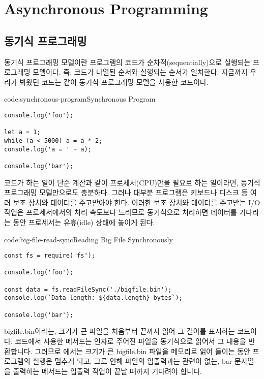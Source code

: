 \section{Asynchronous Programming}\label{sect:asynchronous-programming}

\subsection*{동기식 프로그래밍}

동기식 프로그래밍 모델이란 프로그램의 코드가 순차적(sequentially)으로 실행되는 프로그래밍 모델이다. 즉, 코드가 나열된 순서와 실행되는 순서가 일치한다. 지금까지 우리가 봐왔던 코드는 \과 같이 동기식 프로그래밍 모델을 사용한 코드이다.

\begin{codeenv}{code:synchronous-program}{Synchronous Program}\begin{verbatim}
console.log('foo');

let a = 1;
while (a < 5000) a = a * 2;
console.log('a = ' + a);

console.log('bar');
\end{verbatim}
\end{codeenv}

코드가 하는 일이 단순 계산과 같이 프로세서(CPU)만을 필요로 하는 일이라면, 동기식 프로그래밍 모델만으로도 충분하다. 그러나 대부분 프로그램은 키보드나 디스크 등 여러 보조 장치와 데이터를 주고받아야 한다. 이러한 보조 장치와 데이터를 주고받는 I/O 작업은 프로세서에서의 처리 속도보다 느리므로 동기식으로 처리하면 데이터를 기다리는 동안 프로세서는 유휴(idle) 상태에 놓이게 된다.

\begin{codeenv}{code:big-file-read-sync}{Reading Big File Synchronously}\begin{verbatim}
const fs = require('fs');

console.log('foo');

const data = fs.readFileSync('./bigfile.bin');
console.log(`Data length: ${data.length} bytes`);

console.log('bar');
\end{verbatim}
\end{codeenv}

\는 bigfile.bin이라는, 크기가 큰 파일을 처음부터 끝까지 읽어 그 길이를 표시하는 코드이다. 코드에서 사용한  메서드는 인자로 주어진 파일을 동기식으로 읽어서 그 내용을 반환합니다. 그러므로 에서는 크기가 큰 bigfile.bin 파일을 메모리로 읽어 들이는 동안 프로그램의 실행은 멈추게 되고, 그로 인해 파일의 입출력과는 관련이 없는, bar 문자열을 출력하는 메서드는 입출력 작업이 끝날 때까지 기다려야 합니다.

